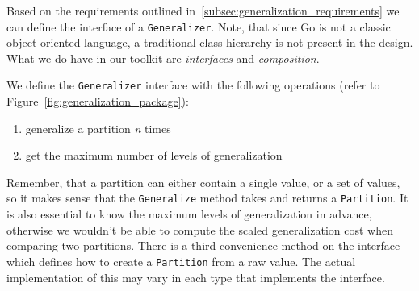 Based on the requirements outlined in~\ref{subsec:generalization_requirements} we can define the interface of a \texttt{Generalizer}.
Note, that since Go is not a classic object oriented language, a traditional class-hierarchy is not present in the design.
What we do have in our toolkit are \textit{interfaces} and \textit{composition}.

We define the \texttt{Generalizer} interface with the following operations (refer to Figure~\ref{fig:generalization_package}):
\begin{enumerate}
    \item generalize a partition \textit{n} times
    \item get the maximum number of levels of generalization
\end{enumerate}
Remember, that a partition can either contain a single value, or a set of values, so it makes sense that the \texttt{Generalize} method takes and returns a \texttt{Partition}.
It is also essential to know the maximum levels of generalization in advance, otherwise we wouldn't be able to compute the scaled generalization cost when comparing two partitions.
There is a third convenience method on the interface which defines how to create a \texttt{Partition} from a raw value.
The actual implementation of this may vary in each type that implements the interface.

\vspace{\baselineskip}

